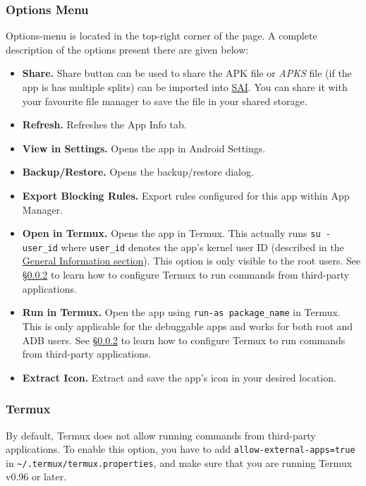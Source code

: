 \subsubsection{Options Menu}\label{subsubsec:app-info-options-menu} %
Options-menu is located in the top-right corner of the page. A complete description of the options present there are
given below:
\begin{itemize}
    \item \textbf{Share.} Share button can be used to share the APK file or \textit{APKS} file (if the app is has
    multiple splits) can be imported into \href{https://github.com/Aefyr/SAI}{SAI}. You can share it with your favourite
    file manager to save the file in your shared storage.

    \item \textbf{Refresh.} Refreshes the App Info tab.
    \item \textbf{View in Settings.} Opens the app in Android Settings.
    \item \textbf{Backup/Restore.} Opens the backup/restore dialog.
    \item \textbf{Export Blocking Rules.} Export rules configured for this app within App Manager.

    \item \textbf{Open in Termux.} Opens the app in Termux. This actually runs \texttt{su - user\_id} where
    \texttt{user\_id} denotes the app's kernel user ID (described in the
    \hyperref[subsubsec:app-info-general-information]{General Information section}). This option is only visible to the
    root users. See §\cref{subsubsec:config-termux} to learn how to configure Termux to run commands from third-party applications.

    \item \textbf{Run in Termux.} Open the app using \texttt{run-as package\_name} in Termux. This is only applicable
    for the debuggable apps and works for both root and ADB users. See §\cref{subsubsec:config-termux} to learn how to
    configure Termux to run commands from third-party applications.

    \item \textbf{Extract Icon.} Extract and save the app's icon in your desired location.
\end{itemize}

\subsubsection{Termux}\label{subsubsec:config-termux} %
By default, Termux does not allow running commands from third-party applications. To enable this option, you have to add
\texttt{allow-external-apps=true} in \texttt{\textasciitilde/.termux/termux.properties}, and make sure that you are
running Termux v0.96 or later.


